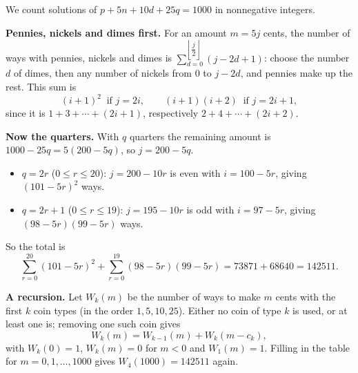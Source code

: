 We count solutions of $p+5n+10d+25q=1000$ in nonnegative integers.

\textbf{Pennies, nickels and dimes first.} For an amount $m=5j$ cents, the number of ways with pennies, nickels and dimes is $\displaystyle\sum_{d=0}^{\left\lfloor\dfrac{j}{2}\right\rfloor}(j-2d+1)$: choose the number $d$ of dimes, then any number of nickels from $0$ to $j-2d$, and pennies make up the rest. This sum is
\[
(i+1)^2\ \text{ if } j=2i,\qquad (i+1)(i+2)\ \text{ if } j=2i+1,
\]
since it is $1+3+\cdots+(2i+1)$, respectively $2+4+\cdots+(2i+2)$.

\textbf{Now the quarters.} With $q$ quarters the remaining amount is $1000-25q=5(200-5q)$, so $j=200-5q$.
\begin{itemize}
\item $q=2r$ ($0\le r\le20$): $j=200-10r$ is even with $i=100-5r$, giving $(101-5r)^2$ ways.
\item $q=2r+1$ ($0\le r\le19$): $j=195-10r$ is odd with $i=97-5r$, giving $(98-5r)(99-5r)$ ways.
\end{itemize}
So the total is
\[
\sum_{r=0}^{20}(101-5r)^2+\sum_{r=0}^{19}(98-5r)(99-5r)=73871+68640=\boxed{142511}.
\]

\textbf{A recursion.} Let $W_k(m)$ be the number of ways to make $m$ cents with the first $k$ coin types (in the order $1,5,10,25$). Either no coin of type $k$ is used, or at least one is; removing one such coin gives
\[
W_k(m)=W_{k-1}(m)+W_k(m-c_k),
\]
with $W_k(0)=1$, $W_k(m)=0$ for $m<0$ and $W_1(m)=1$. Filling in the table for $m=0,1,\dots,1000$ gives $W_4(1000)=142511$ again.
